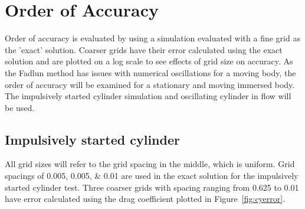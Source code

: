 \documentclass[onehalf,11pt]{beavtex}
\begin{document}
\section{Order of Accuracy}
Order of accuracy is evaluated by using a simulation evaluated with a fine grid as the 'exact' solution.
Coarser grids have their error calculated using the exact solution and are plotted on a log scale to see effects of grid size on accuracy.
As the Fadlun method has issues with numerical oscillations for a moving body, the order of accuracy will be examined for a stationary and moving immersed body.
The impulsively started cylinder simulation and oscillating cylinder in flow will be used.
\subsection{Impulsively started cylinder}
All grid sizes will refer to the grid spacing in the middle, which is uniform.
Grid spacings of \numlist{0.005; 0.005; 0.01} are used in the exact solution for the impulsively started cylinder test.
Three coarser grids with spacing ranging from 0.625 to 0.01 have error calculated using the drag coefficient plotted in Figure~\ref{fig:cyerror}.
\end{document}
